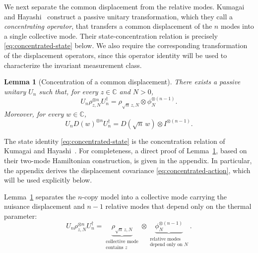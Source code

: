 \documentclass{article}
\newtheorem{lemma}[theorem]{Lemma}
\theoremstyle{named}
\theoremstyle{named1}
\newcommand{\bbC}{\mathbb C}
\theoremstyle{plain}
\theoremstyle{remark}
\begin{document}
We next separate the common displacement from the relative modes.
Kumagai and Hayashi~\cite[Section~2]{KumagaiHayashi2013} construct a
passive unitary transformation, which they call a \emph{concentrating
operator}, that transfers a common displacement of the $n$ modes into a
single collective mode. Their state-concentration relation is precisely
\eqref{eq:concentrated-state} below. We also require the corresponding
transformation of the displacement operators, since this operator identity
will be used to characterize the invariant measurement class.

\begin{lemma}[Concentration of a common displacement]
\label{lem:concentration}
There exists a passive unitary $U_n$ such that, for every
$z\in\bbC$ and $N>0$,
\begin{equation}
    U_n
    \rho_{z,N}^{\otimes n}
    U_n^\dagger
    =
    \rho_{\sqrt n\,z,N}
    \otimes
    \phi_N^{\otimes(n-1)}.
    \label{eq:concentrated-state}
\end{equation}
Moreover, for every $w\in\bbC$,
\begin{equation}
    U_n
    D(w)^{\otimes n}
    U_n^\dagger
    =
    D(\sqrt n\,w)
    \otimes
    I^{\otimes(n-1)}.
    \label{eq:concentrated-action}
\end{equation}
\end{lemma}

The state identity \eqref{eq:concentrated-state} is the concentration
relation of Kumagai and Hayashi~\cite[Eq.~(2.5)]{KumagaiHayashi2013}.
For completeness, a direct proof of Lemma~\ref{lem:concentration}, based
on their two-mode Hamiltonian construction, is given in
the appendix. In particular, the appendix derives
the displacement covariance \eqref{eq:concentrated-action}, which will be
used explicitly below.

Lemma~\ref{lem:concentration} separates the $n$-copy model into a
collective mode carrying the nuisance displacement and $n-1$ relative modes
that depend only on the thermal parameter:
\begin{equation}
    U_n
    \rho_{z,N}^{\otimes n}
    U_n^\dagger
    =
    \underbrace{
        \rho_{\sqrt n\,z,N}
    }_{\substack{\text{collective mode}\\\text{contains }z}}
    \otimes
    \underbrace{
        \phi_N^{\otimes(n-1)}
    }_{\substack{\text{relative modes}\\\text{depend only on }N}}.
    \label{eq:collective-relative}
\end{equation}
\end{document}
